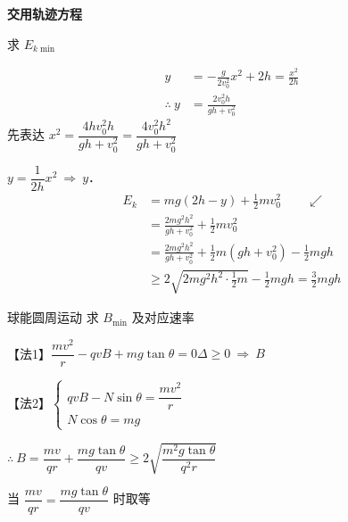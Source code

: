 \begin{problem}
\textbf{交用轨迹方程}


求 $E_{k\min}$
\begin{solution}
\begin{align*}
y&=-\frac{g}{2v_0^2}x^2+2h=\frac{x^2}{2h}\\
\therefore\ y&=\frac{2v_0^2h}{gh+v_0^2}
\end{align*}
先表达 $x^2=\dfrac{4hv_0^2h}{gh+v_0^2}=\dfrac{4v_0^2h^2}{gh+v_0^2}$

\quad $y=\dfrac{1}{2h}x^2\ \Rightarrow\ y$．
\begin{align*}
E_k&=mg(2h-y)+\frac{1}{2}mv_0^2\qquad\swarrow\\
&=\frac{2mg^2h^2}{gh+v_0^2}+\frac{1}{2}mv_0^2\\
&=\frac{2mg^2h^2}{gh+v_0^2}+\frac{1}{2}m(gh+v_0^2)-\frac{1}{2}mgh\\
&\ge2\sqrt{2mg^2h^2\cdot\frac{1}{2}m}-\frac{1}{2}mgh=\frac{3}{2}mgh
\end{align*}
\end{solution}
\end{problem}
\begin{problem}[2]


球能圆周运动 求 $B_{\min}$ 及对应速率
\begin{solution}
【法1】\quad $\dfrac{mv^2}{r}-qvB+mg\tan\theta=0$\qquad $\Delta\ge0\ \Rightarrow\ B$

【法2】\quad $\left\{\begin{array}{l}qvB-N\sin\theta=\dfrac{mv^2}{r}\\[2mm] N\cos\theta=mg\end{array}\right.$

$\therefore\ B=\dfrac{mv}{qr}+\dfrac{mg\tan\theta}{qv}\ge2\sqrt{\dfrac{m^2g\tan\theta}{q^2r}}$ %

当 $\dfrac{mv}{qr}=\dfrac{mg\tan\theta}{qv}$ 时取等
\end{solution}
\end{problem}
